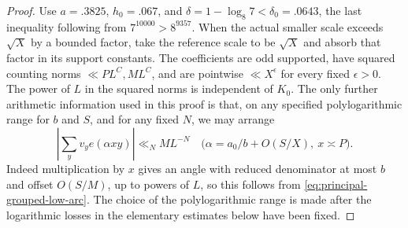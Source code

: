 \documentclass[11pt,a4paper]{article}
\theoremstyle{paperplain}
\numberwithin{equation}{section}
\begin{document}
\begin{proof}
Use $a=.3825$, $h_0=.067$, and $\delta=1-\log_8 7<\delta_0=.0643$,
the last inequality following from $7^{10000}>8^{9357}$.
When the actual smaller scale exceeds $\sqrt X$ by a bounded factor,
take the reference scale to be $\sqrt X$ and absorb that factor in its
support constants. The coefficients are odd supported, have squared
counting norms $\ll PL^C,ML^C$, and are pointwise $\ll X^\epsilon$ for
every fixed $\epsilon>0$. The power of $L$ in the squared norms is
independent of $K_0$. The only further arithmetic information used in
this proof is that, on any specified polylogarithmic range for $b$ and
$S$, and for any fixed $N$, we may arrange
\begin{equation}\label{eq:near-balanced-small-model-arc}
    \left|\sum_y v_y e(\alpha xy)\right|\ll_N M L^{-N}
   \quad\bigl(\alpha=a_0/b+O(S/X),\ x\asymp P\bigr).
\end{equation}
Indeed multiplication by $x$ gives an angle with reduced denominator
at most $b$ and offset $O(S/M)$, up to powers of $L$, so this follows
from \eqref{eq:principal-grouped-low-arc}. The choice of the
polylogarithmic range is made after the logarithmic losses in the
elementary estimates below have been fixed.


\end{proof}
\end{document}
